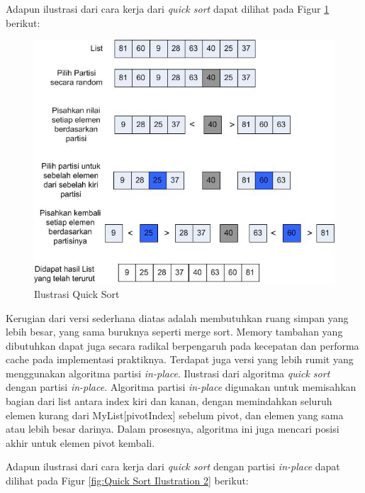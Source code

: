 \newpage{}
Adapun ilustrasi dari cara kerja dari \textit{quick sort} dapat dilihat pada Figur \ref{fig:Quick Sort Ilustration} berikut:

\begin{figure}[htbp]
\begin{center}
	\includegraphics[scale=0.8]{fig/sunario-3/QuickSort.jpg}%
	\caption{Ilustrasi Quick Sort}%
	\label{fig:Quick Sort Ilustration}%
\end{center}
\end{figure}

Kerugian dari versi sederhana diatas adalah membutuhkan ruang simpan yang lebih besar, yang sama buruknya seperti merge sort. Memory tambahan yang dibutuhkan dapat juga secara radikal berpengaruh pada kecepatan dan performa cache pada implementasi praktiknya. Terdapat juga versi yang lebih rumit yang menggunakan algoritma partisi \textit{in-place}. Ilustrasi dari algoritma \textit{quick sort} dengan partisi \textit{in-place}. Algoritma partisi \textit{in-place} digunakan untuk memisahkan bagian dari list antara index kiri dan kanan, dengan memindahkan seluruh elemen kurang dari MyList[pivotIndex] sebelum pivot, dan elemen yang sama atau lebih besar darinya. Dalam prosesnya, algoritma ini juga mencari posisi akhir untuk elemen pivot kembali. 


Adapun ilustrasi dari cara kerja dari \textit{quick sort} dengan partisi \textit{in-place} dapat dilihat pada Figur \ref{fig:Quick Sort Ilustration 2} berikut:

